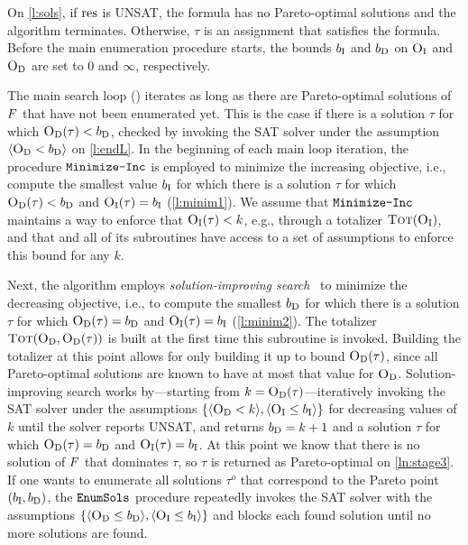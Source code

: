 On \cref{l:sols}, if $\text{res}$ is UNSAT, the formula has no Pareto-optimal solutions and the algorithm terminates.
Otherwise, $\tau$ is an assignment that satisfies the formula.
Before the main enumeration procedure starts, the bounds $b_{\text{I}}$ and $b_{\text{D}}$ on $\textsc{O}_{\text{I}}$ and $\textsc{O}_{\text{D}}$ are set to $0$ and $\infty$, respectively.

The main search loop () iterates as long as there are Pareto-optimal solutions of $F$ that have not been enumerated yet. 
This is the case if there is a solution $\tau$ for which $\textsc{O}_{\text{D}}(\tau) < b_{\text{D}}$, checked by invoking the SAT solver under the assumption $\langle \textsc{O}_{\text{D}} < b_{\text{D}} \rangle$ on \cref{l:endL}.
In the beginning of each main loop iteration, the procedure $\texttt{Minimize-\allowbreak{}Inc}$ is employed to minimize the increasing objective, i.e., compute the smallest value $b_{\text{I}}$ for which there is a solution $\tau$ for which $\textsc{O}_{\text{D}}(\tau) < b_{\text{D}}$ and $\textsc{O}_{\text{I}}(\tau) = b_{\text{I}}$  (\cref{l:minim1}). 
We assume that $\texttt{Minimize-\allowbreak{}Inc}$ maintains a way to enforce that $\textsc{O}_{\text{I}}(\tau) < k$, e.g., through a totalizer $\textsc{Tot}(\textsc{O}_{\text{I}})$, and that \algname{} and all of its subroutines have access to a set of assumptions to enforce this bound for any $k$.

Next, the algorithm employs \emph{solution-improving search}~\autocites{handbook2-maxsat,DBLP:journals/jsat/BerreP10,DBLP:journals/jsat/EenS06} to minimize the decreasing objective, i.e., to compute the smallest $b_{\text{D}}$ for which there is a solution $\tau$ for which $\textsc{O}_{\text{D}}(\tau) = b_{\text{D}}$ and $\textsc{O}_{\text{I}}(\tau) = b_{\text{I}}$  (\cref{l:minim2}).
The totalizer $\textsc{Tot}(\textsc{O}_{\text{D}}, \textsc{O}_{\text{D}}(\tau))$ is built at the first time this subroutine is invoked.
Building the totalizer at this point allows for only building it up to bound $\textsc{O}_{\text{D}}(\tau)$, since all Pareto-optimal solutions are known to have at most that value for $\textsc{O}_{\text{D}}$.
Solution-improving search works by---starting from $k=\textsc{O}_{\text{D}}(\tau)$---iteratively invoking the SAT solver under the assumptions $\{\langle \textsc{O}_{\text{D}} < k \rangle, \langle \textsc{O}_{\text{I}} \leq b_{\text{I}} \rangle\}$ for decreasing values of $k$ until the solver reports UNSAT, and returns $b_{\text{D}}=k+1$ and a solution $\tau$ for which $\textsc{O}_{\text{D}}(\tau) = b_{\text{D}}$ and $\textsc{O}_{\text{I}}(\tau) = b_{\text{I}}$.
At this point we know that there is no solution of $F$ that dominates $\tau$, so $\tau$ is returned as Pareto-optimal on \cref{ln:stage3}.
If one wants to enumerate all solutions $\tau^o$ that correspond to the Pareto point $(b_{\text{I}},b_{\text{D}})$, the $\texttt{EnumSols}$ procedure repeatedly invokes the SAT solver with the assumptions $\{\langle \textsc{O}_{\text{D}} \leq b_{\text{D}} \rangle , \langle \textsc{O}_{\text{I}} \leq b_{\text{I}} \rangle\}$ and blocks each found solution until no more solutions are found.

